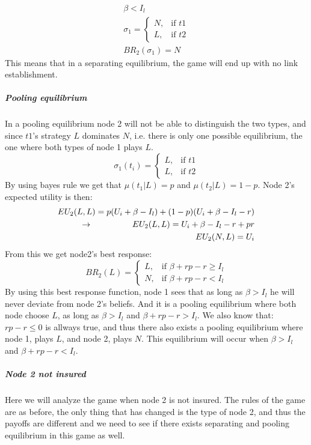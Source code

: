 \begin{eqnarray}
\beta<I_{l}\\
 \sigma_{1}= 
\begin{cases}
   N,& \text{if } t1\\
   L,& \text{if } t2  
\end{cases}\\
BR_{2}(\sigma_{1})=N
\end{eqnarray} 
This means that in a separating equilibrium, the game will end up with no link establishment.
\subparagraph{Pooling equilibrium}
In a pooling equilibrium node 2 will not be able to distinguish the two types, and since $t1$'s strategy $L$ dominates $N$, i.e. there is only one possible equilibrium, the one where both types of node 1 plays $L$.
\begin{equation}
    \sigma_{1}(t_{i})= 
\begin{cases}
   L,& \text{if } t1\\
   L,& \text{if } t2  
\end{cases}
\label{eq:node2beliefpooling}
\end{equation}
By using bayes rule we get that $\mu(t_{1}|L)=p$ and $\mu(t_{2}|L)=1-p$.
Node 2's expected utility is then:
\begin{eqnarray}
EU_{2}(L,L)=p(U_{i}+\beta-I_{l})+(1-p)(U_{i}+\beta-I_{l}-r)\nonumber\\
\llap{$\rightarrow$\hspace{50pt}}EU_{2}(L,L)=U_{i}+\beta-I_{l}-r+pr\\
EU_{2}(N,L)=U_{i}
\end{eqnarray}
From this we get node2's best response:
\begin{equation}
BR_{2}(L)=
\begin{cases}
L ,& \text{if } \beta + rp-r\geq I_{l} \\
N ,& \text{if } \beta +rp -r < I_{l} 
\end{cases}
\end{equation}
By using this best response function, node 1 sees that as long as $\beta>I_{l}$ he will never deviate from node 2's beliefs. And it is a pooling equilibrium where both node choose $L$, as long as $\beta>I_{l}$ and $\beta +rp-r>I_{l}$.
We also know that: $rp-r\leq0$ is allways true, and thus there also exists a pooling equilibrium where node 1, plays $L$, and node 2, plays $N$. This equilibrium will occur when $\beta>I_{l}$ and $\beta+rp-r<I_{l}$.
\subparagraph{Node 2 not insured}
Here we will analyze the game when node 2 is not insured.
The rules of the game are as before, the only thing that has changed is the type of node 2, and thus the payoffs are different and we need to see if there exists separating and pooling equilibrium in this game as well.
